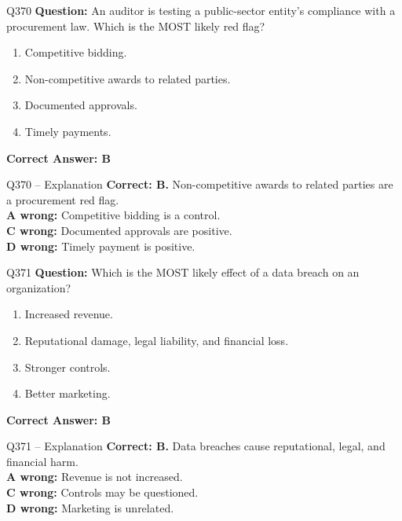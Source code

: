 \documentclass[aspectratio=169,10pt]{beamer}
\begin{document}
	\begin{frame}[t]{Q370}
		\small
		\textbf{Question:} An auditor is testing a public-sector entity's compliance with a procurement law. Which is the MOST likely red flag?
		\begin{enumerate}[label=\Alph*.,itemsep=1pt,topsep=2pt]
			\item Competitive bidding.
			\item Non-competitive awards to related parties.
			\item Documented approvals.
			\item Timely payments.
		\end{enumerate}
		\vspace{4pt}
		\textbf{Correct Answer: B}
	\end{frame}
	
	\begin{frame}[t]{Q370 -- Explanation}
		\small
		\textbf{Correct: B.} Non-competitive awards to related parties are a procurement red flag. \\[4pt]
		\textbf{A wrong:} Competitive bidding is a control. \\[2pt]
		\textbf{C wrong:} Documented approvals are positive. \\[2pt]
		\textbf{D wrong:} Timely payment is positive.
	\end{frame}
	
	\begin{frame}[t]{Q371}
		\small
		\textbf{Question:} Which is the MOST likely effect of a data breach on an organization?
		\begin{enumerate}[label=\Alph*.,itemsep=1pt,topsep=2pt]
			\item Increased revenue.
			\item Reputational damage, legal liability, and financial loss.
			\item Stronger controls.
			\item Better marketing.
		\end{enumerate}
		\vspace{4pt}
		\textbf{Correct Answer: B}
	\end{frame}
	
	\begin{frame}[t]{Q371 -- Explanation}
		\small
		\textbf{Correct: B.} Data breaches cause reputational, legal, and financial harm. \\[4pt]
		\textbf{A wrong:} Revenue is not increased. \\[2pt]
		\textbf{C wrong:} Controls may be questioned. \\[2pt]
		\textbf{D wrong:} Marketing is unrelated.
	\end{frame}
	
\end{document}
